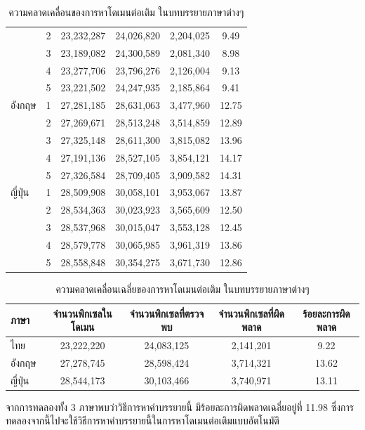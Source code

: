 \documentclass[hidelinks, a4paper,12pt]{article}
\numberwithin{equation}{section}							%
\numberwithin{equation}{section}
\begin{document}
{\begin{table}[H]
\begin{tabular}[ht]{|l|c|c|c|c|c|}
				 & 2 & 23,232,287 & 24,026,820 & 2,204,025 & 9.49\\
				& 3 & 23,189,082 & 24,300,589 & 2,081,340 & 8.98\\
				& 4 & 23,277,706 & 23,796,276  & 2,126,004 & 9.13\\
				& 5 & 23,221,502 & 24,247,935 & 2,185,864 & 9.41\\
			\hline
			อังกฤษ & 1 & 27,281,185 & 28,631,063 & 3,477,960  & 12.75\\
			& 2 & 27,269,671 & 28,513,248 & 3,514,859 & 12.89\\
			& 3 & 27,325,148 & 28,611,300 & 3,815,082 & 13.96\\
			& 4 & 27,191,136 & 28,527,105 & 3,854,121 & 14.17\\
			& 5 & 27,326,584 & 28,709,405 & 3,909,582 & 14.31\\
			\hline
			ญี่ปุ่น & 1 & 28,509,908 & 30,058,101 &  3,953,067 & 13.87\\
			& 2 & 28,534,363  & 30,023,923 & 3,565,609 & 12.50\\
			& 3 & 28,537,968 & 30,015,047 & 3,553,128 & 12.45\\
			& 4 & 28,579,778 & 30,065,985 & 3,961,319 & 13.86\\
			& 5 & 28,558,848 & 30,354,275 & 3,671,730 & 12.86\\
			\hline
		\end{tabular}
		\caption{ความคลาดเคลื่อนของการหาโดเมนต่อเติม ในบทบรรยายภาษาต่างๆ}
	\end{table}
	\begin{table}[H]
		\centering
			\footnotesize
		\begin{tabular}[ht]{|l|c|c|c|c|}
			\hline
			ภาษา  & จำนวนพิกเซลในโดเมน & จำนวนพิกเซลที่ตรวจพบ & จำนวนพิกเซลที่ผิดพลาด & ร้อยละการผิดพลาด \\
			\hline
			ไทย & 23,222,220 & 24,083,125 & 2,141,201 & 9.22 \\
			อังกฤษ & 27,278,745 & 28,598,424 & 3,714,321 & 13.62 \\
			ญี่ปุ่น & 28,544,173 & 30,103,466 & 3,740,971 & 13.11 \\
			\hline
		\end{tabular}
		\caption{ความคลาดเคลื่อนเฉลี่ยของการหาโดเมนต่อเติม ในบทบรรยายภาษาต่างๆ}
	\end{table}	
	
	\hspace{1cm} จากการทดลองทั้ง  3 ภาษาพบว่าวิธีการหาคำบรรยายนี้ มีร้อยละการผิดพลาดเฉลี่ยอยู่ที่ 11.98 ซึ่งการทดลองจากนี้ไปจะใช้วิธีการหาคำบรรยายนี้ในการหาโดเมนต่อเติมแบบอัตโนมัติ
	\clearpage
}
\end{document}
